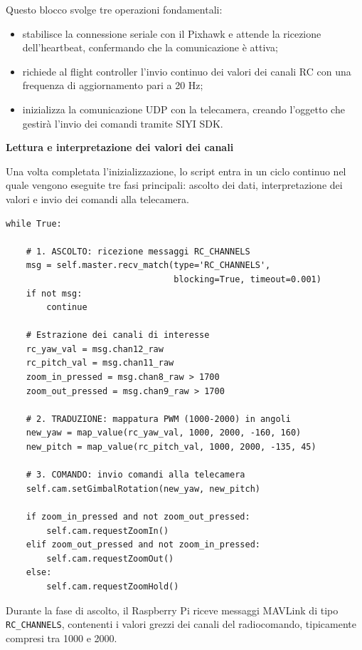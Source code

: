 Questo blocco svolge tre operazioni fondamentali:

\begin{itemize}
    \item stabilisce la connessione seriale con il Pixhawk e attende la ricezione dell’heartbeat, confermando che la comunicazione è attiva;
    \item richiede al flight controller l’invio continuo dei valori dei canali RC con una frequenza di aggiornamento pari a 20 Hz;
    \item inizializza la comunicazione UDP con la telecamera, creando l’oggetto che gestirà l’invio dei comandi tramite SIYI SDK.
\end{itemize}

\bigskip

\bigskip
\noindent \textbf{Lettura e interpretazione dei valori dei canali}
\bigskip

Una volta completata l’inizializzazione, lo script entra in un ciclo continuo nel quale vengono eseguite tre fasi principali: ascolto dei dati, interpretazione dei valori e invio dei comandi alla telecamera.
\begin{verbatim}
while True:

    # 1. ASCOLTO: ricezione messaggi RC_CHANNELS
    msg = self.master.recv_match(type='RC_CHANNELS',
                                 blocking=True, timeout=0.001)
    if not msg:
        continue

    # Estrazione dei canali di interesse
    rc_yaw_val = msg.chan12_raw
    rc_pitch_val = msg.chan11_raw
    zoom_in_pressed = msg.chan8_raw > 1700
    zoom_out_pressed = msg.chan9_raw > 1700

    # 2. TRADUZIONE: mappatura PWM (1000-2000) in angoli
    new_yaw = map_value(rc_yaw_val, 1000, 2000, -160, 160)
    new_pitch = map_value(rc_pitch_val, 1000, 2000, -135, 45)

    # 3. COMANDO: invio comandi alla telecamera
    self.cam.setGimbalRotation(new_yaw, new_pitch)

    if zoom_in_pressed and not zoom_out_pressed:
        self.cam.requestZoomIn()
    elif zoom_out_pressed and not zoom_in_pressed:
        self.cam.requestZoomOut()
    else:
        self.cam.requestZoomHold()
\end{verbatim}

\bigskip
\noindent
Durante la fase di ascolto, il Raspberry Pi riceve messaggi MAVLink di tipo \texttt{RC\_CHANNELS}, contenenti i valori grezzi dei canali del radiocomando, tipicamente compresi tra 1000 e 2000.

